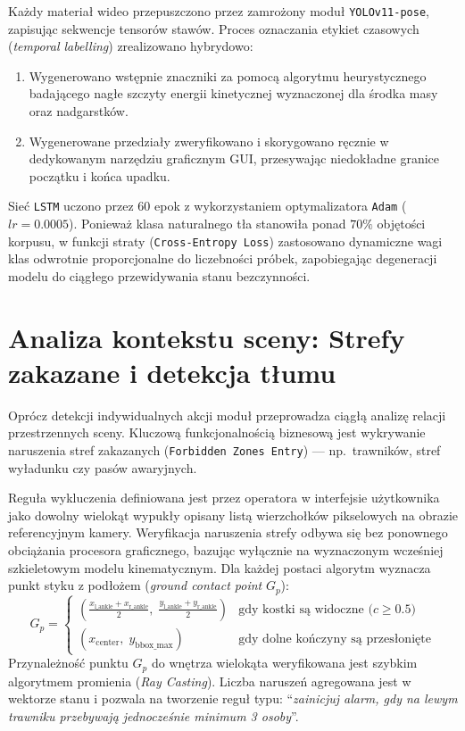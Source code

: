 Każdy materiał wideo przepuszczono przez zamrożony moduł \texttt{YOLOv11-pose}, zapisując sekwencje tensorów stawów. Proces oznaczania etykiet czasowych (\textit{temporal labelling}) zrealizowano hybrydowo:
\begin{enumerate}
    \item Wygenerowano wstępnie znaczniki za pomocą algorytmu heurystycznego badającego nagłe szczyty energii kinetycznej wyznaczonej dla środka masy oraz nadgarstków.
    \item Wygenerowane przedziały zweryfikowano i skorygowano ręcznie w dedykowanym narzędziu graficznym GUI, przesywając niedokładne granice początku i końca upadku. 
\end{enumerate}
Sieć \texttt{LSTM} uczono przez 60 epok z wykorzystaniem optymalizatora \texttt{Adam} ($lr=0.0005$). Ponieważ klasa naturalnego tła stanowiła ponad $70\%$ objętości korpusu, w funkcji straty (\texttt{Cross-Entropy Loss}) zastosowano dynamiczne wagi klas odwrotnie proporcjonalne do liczebności próbek, zapobiegając degeneracji modelu do ciągłego przewidywania stanu bezczynności.

\section{Analiza kontekstu sceny: Strefy zakazane i detekcja tłumu}\label{sec:detektor_scena}

Oprócz detekcji indywidualnych akcji moduł przeprowadza ciągłą analizę relacji przestrzennych sceny. Kluczową funkcjonalnością biznesową jest wykrywanie naruszenia stref zakazanych (\texttt{Forbidden Zones Entry}) --- np.\ trawników, stref wyładunku czy pasów awaryjnych.

Reguła wykluczenia definiowana jest przez operatora w interfejsie użytkownika jako dowolny wielokąt wypukły opisany listą wierzchołków pikselowych na obrazie referencyjnym kamery. Weryfikacja naruszenia strefy odbywa się bez ponownego obciążania procesora graficznego, bazując wyłącznie na wyznaczonym wcześniej szkieletowym modelu kinematycznym. Dla każdej postaci algorytm wyznacza punkt styku z podłożem (\textit{ground contact point} $G_p$):
\begin{equation}
    G_p = \begin{cases} 
      \left( \frac{x_{\text{l\_ankle}} + x_{\text{r\_ankle}}}{2}, \; \frac{y_{\text{l\_ankle}} + y_{\text{r\_ankle}}}{2} \right) & \text{gdy kostki są widoczne ($c \ge 0.5$)} \\
      \left( x_{\text{center}}, \; y_{\text{bbox\_max}} \right) & \text{gdy dolne kończyny są przesłonięte}
   \end{cases}
\end{equation}
Przynależność punktu $G_p$ do wnętrza wielokąta weryfikowana jest szybkim algorytmem promienia (\textit{Ray Casting}). Liczba naruszeń agregowana jest w wektorze stanu i pozwala na tworzenie reguł typu: \enquote{\textit{zainicjuj alarm, gdy na lewym trawniku przebywają jednocześnie minimum 3 osoby}}.

